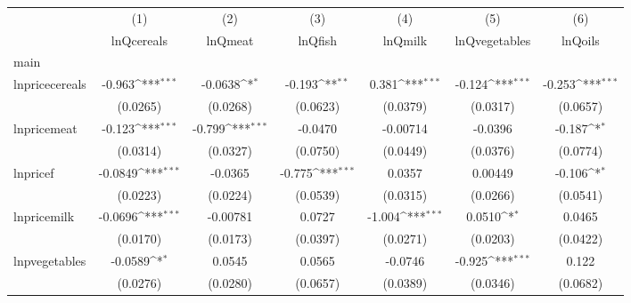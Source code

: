 {
\def\sym#1{\ifmmode^{#1}\else\(^{#1}\)\fi}
\begin{tabular}{l*{6}{c}}
\hline\hline
            &\multicolumn{1}{c}{(1)}&\multicolumn{1}{c}{(2)}&\multicolumn{1}{c}{(3)}&\multicolumn{1}{c}{(4)}&\multicolumn{1}{c}{(5)}&\multicolumn{1}{c}{(6)}\\
            &\multicolumn{1}{c}{lnQcereals}&\multicolumn{1}{c}{lnQmeat}&\multicolumn{1}{c}{lnQfish}&\multicolumn{1}{c}{lnQmilk}&\multicolumn{1}{c}{lnQvegetables}&\multicolumn{1}{c}{lnQoils}\\
\hline
main        &                     &                     &                     &                     &                     &                     \\
lnpricecereals&      -0.963\sym{***}&     -0.0638\sym{*}  &      -0.193\sym{**} &       0.381\sym{***}&      -0.124\sym{***}&      -0.253\sym{***}\\
            &    (0.0265)         &    (0.0268)         &    (0.0623)         &    (0.0379)         &    (0.0317)         &    (0.0657)         \\
[1em]
lnpricemeat &      -0.123\sym{***}&      -0.799\sym{***}&     -0.0470         &    -0.00714         &     -0.0396         &      -0.187\sym{*}  \\
            &    (0.0314)         &    (0.0327)         &    (0.0750)         &    (0.0449)         &    (0.0376)         &    (0.0774)         \\
[1em]
lnpricef    &     -0.0849\sym{***}&     -0.0365         &      -0.775\sym{***}&      0.0357         &     0.00449         &      -0.106\sym{*}  \\
            &    (0.0223)         &    (0.0224)         &    (0.0539)         &    (0.0315)         &    (0.0266)         &    (0.0541)         \\
[1em]
lnpricemilk &     -0.0696\sym{***}&    -0.00781         &      0.0727         &      -1.004\sym{***}&      0.0510\sym{*}  &      0.0465         \\
            &    (0.0170)         &    (0.0173)         &    (0.0397)         &    (0.0271)         &    (0.0203)         &    (0.0422)         \\
[1em]
lnpvegetables&     -0.0589\sym{*}  &      0.0545         &      0.0565         &     -0.0746         &      -0.925\sym{***}&       0.122         \\
            &    (0.0276)         &    (0.0280)         &    (0.0657)         &    (0.0389)         &    (0.0346)         &    (0.0682)         \\

\end{tabular}}
